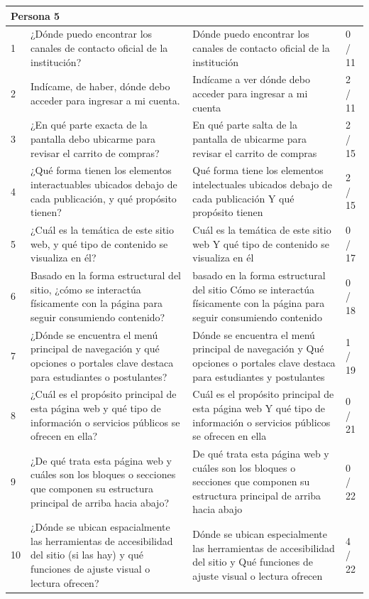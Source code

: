\begin{longtable}{|p{0.5cm}|p{5.7cm}|p{5.7cm}|p{1.5cm}|}
    \multicolumn{4}{|l|}{\textbf{Persona 5}} \\
    \hline
    1 & ¿Dónde puedo encontrar los canales de contacto oficial de la institución? & Dónde puedo encontrar los canales de contacto oficial de la institución & 0 / 11 \\
    \hline
    2 & Indícame, de haber, dónde debo acceder para ingresar a mi cuenta. & Indícame a ver dónde debo acceder para ingresar a mi cuenta & 2 / 11 \\
    \hline
    3 & ¿En qué parte exacta de la pantalla debo ubicarme para revisar el carrito de compras? & En qué parte salta de la pantalla de ubicarme para revisar el carrito de compras & 2 / 15 \\
    \hline
    4 & ¿Qué forma tienen los elementos interactuables ubicados debajo de cada publicación, y qué propósito tienen? & Qué forma tiene los elementos intelectuales ubicados debajo de cada publicación Y qué propósito tienen & 2 / 15 \\
    \hline
    5 & ¿Cuál es la temática de este sitio web, y qué tipo de contenido se visualiza en él? & Cuál es la temática de este sitio web Y qué tipo de contenido se visualiza en él & 0 / 17 \\
    \hline
    6 & Basado en la forma estructural del sitio, ¿cómo se interactúa físicamente con la página para seguir consumiendo contenido? & basado en la forma estructural del sitio Cómo se interactúa físicamente con la página para seguir consumiendo contenido & 0 / 18 \\
    \hline
    7 & ¿Dónde se encuentra el menú principal de navegación y qué opciones o portales clave destaca para estudiantes o postulantes? & Dónde se encuentra el menú principal de navegación y Qué opciones o portales clave destaca para estudiantes y postulantes & 1 / 19 \\
    \hline
    8 & ¿Cuál es el propósito principal de esta página web y qué tipo de información o servicios públicos se ofrecen en ella? & Cuál es el propósito principal de esta página web Y qué tipo de información o servicios públicos se ofrecen en ella & 0 / 21 \\
    \hline
    9 & ¿De qué trata esta página web y cuáles son los bloques o secciones que componen su estructura principal de arriba hacia abajo? & De qué trata esta página web y cuáles son los bloques o secciones que componen su estructura principal de arriba hacia abajo & 0 / 22 \\
    \hline
    10 & ¿Dónde se ubican espacialmente las herramientas de accesibilidad del sitio (si las hay) y qué funciones de ajuste visual o lectura ofrecen? & Dónde se ubican especialmente las herramientas de accesibilidad del sitio y Qué funciones de ajuste visual o lectura ofrecen & 4 / 22 \\
    \hline
\end{longtable}
